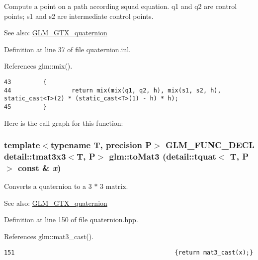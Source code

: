 Compute a point on a path according squad equation. q1 and q2 are control points; s1 and s2 are intermediate control points.

\begin{Desc}
\item[See also:]\hyperlink{group__gtx__quaternion}{GLM\_\-GTX\_\-quaternion} \end{Desc}


Definition at line 37 of file quaternion.inl.

References glm::mix().

\begin{Code}\begin{verbatim}43         {
44                 return mix(mix(q1, q2, h), mix(s1, s2, h), static_cast<T>(2) * (static_cast<T>(1) - h) * h);
45         }
\end{verbatim}
\end{Code}




Here is the call graph for this function:\hypertarget{group__gtx__quaternion_gdff49fcff8a70186d2fe32117cb565e0}{
\subsubsection[toMat3]{\setlength{\rightskip}{0pt plus 5cm}template$<$typename T, precision P$>$ GLM\_\-FUNC\_\-DECL detail::tmat3x3$<$T, P$>$ glm::toMat3 (detail::tquat$<$ T, P $>$ const \& {\em x})}}
\label{group__gtx__quaternion_gdff49fcff8a70186d2fe32117cb565e0}


Converts a quaternion to a 3 $\ast$ 3 matrix.

\begin{Desc}
\item[See also:]\hyperlink{group__gtx__quaternion}{GLM\_\-GTX\_\-quaternion} \end{Desc}


Definition at line 150 of file quaternion.hpp.

References glm::mat3\_\-cast().

\begin{Code}\begin{verbatim}151                                             {return mat3_cast(x);}
\end{verbatim}
\end{Code}




